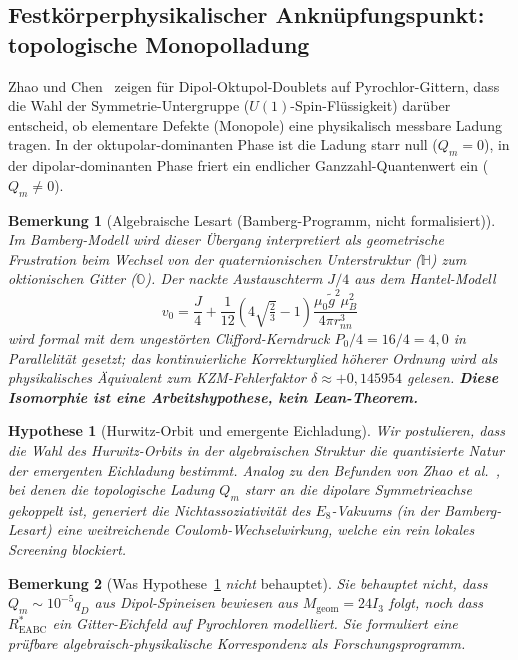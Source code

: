 \documentclass[11pt,a4paper]{article}
\newtheorem{remark}{Bemerkung}
\newtheorem{hypothesis}{Hypothese}
\begin{document}
	\subsection{Festkörperphysikalischer Anknüpfungspunkt: topologische Monopolladung}
	\label{sec:bridge-condensed-matter}
	
	Zhao und Chen~\cite{zhao-chen-2026} zeigen für Dipol-Oktupol-Doublets auf
	Pyrochlor-Gittern, dass die Wahl der Symmetrie-Untergruppe
	($U(1)$-Spin-Flüssigkeit) darüber entscheid, ob elementare Defekte (Monopole)
	eine physikalisch messbare Ladung tragen.
	In der oktupolar-dominanten Phase ist die Ladung starr null ($Q_m=0$),
	in der dipolar-dominanten Phase friert ein endlicher Ganzzahl-Quantenwert ein
	($Q_m\neq 0$).
	
	\begin{remark}[Algebraische Lesart (Bamberg-Programm, nicht formalisiert)]
		Im Bamberg-Modell wird dieser Übergang \emph{interpretiert} als geometrische
		Frustration beim Wechsel von der quaternionischen Unterstruktur ($\mathbb{H}$)
		zum oktionischen Gitter ($\mathbb{O}$).
		Der nackte Austauschterm $J/4$ aus dem Hantel-Modell
		\[
		v_0 = \frac{J}{4} + \frac{1}{12}\left(4\sqrt{\tfrac{2}{3}}-1\right)
		\frac{\mu_0 \tilde{g}^2 \mu_B^2}{4\pi r_{nn}^3}
		\]
		wird formal mit dem ungestörten Clifford-Kerndruck $P_0/4=16/4=4{,}0$
		in Parallelität gesetzt; das kontinuierliche Korrekturglied höherer Ordnung
		wird als physikalisches Äquivalent zum KZM-Fehlerfaktor
		$\delta\approx +0{,}145954$ gelesen.
		\textbf{Diese Isomorphie ist eine Arbeitshypothese, kein Lean-Theorem.}
	\end{remark}
	
	\begin{hypothesis}[Hurwitz-Orbit und emergente Eichladung]
		\label{hyp:hurwitz-charge}
		Wir postulieren, dass die Wahl des Hurwitz-Orbits in der algebraischen Struktur
		die quantisierte Natur der emergenten Eichladung bestimmt.
		Analog zu den Befunden von Zhao et al.~\cite{zhao-chen-2026}, bei denen die
		topologische Ladung $Q_m$ starr an die dipolare Symmetrieachse gekoppelt ist,
		generiert die Nichtassoziativität des $E_8$-Vakuums (in der Bamberg-Lesart)
		eine weitreichende Coulomb-Wechselwirkung, welche ein rein lokales Screening
		blockiert.
	\end{hypothesis}
	
	\begin{remark}[Was Hypothese~\ref{hyp:hurwitz-charge} \emph{nicht} behauptet]
		Sie behauptet nicht, dass $Q_m\sim 10^{-5}q_D$ aus Dipol-Spineisen
		\emph{bewiesen} aus $M_{\mathrm{geom}}=24I_3$ folgt,
		noch dass $R^*_{\mathrm{EABC}}$ ein Gitter-Eichfeld auf Pyrochloren modelliert.
		Sie formuliert eine prüfbare algebraisch-physikalische Korrespondenz als
		Forschungsprogramm.
	\end{remark}
	
\end{document}
